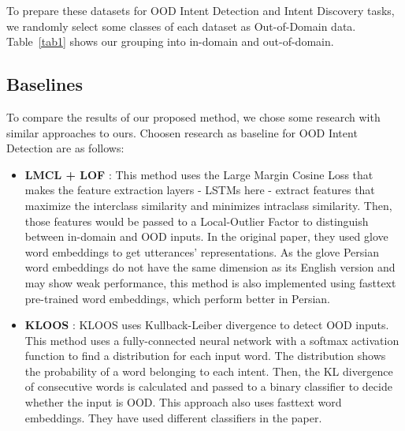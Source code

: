\documentclass{article}
\begin{document}
To prepare these datasets for OOD Intent Detection and Intent Discovery tasks,
we randomly select some classes of each dataset as Out-of-Domain data.
Table~\ref{tab1} shows our grouping into in-domain and out-of-domain.

\subsection{Baselines}

\noindent To compare the results of our proposed method, we chose some research with similar approaches to ours.
Choosen research as baseline for OOD Intent Detection are as follows:
\begin{itemize}
  \item \textbf{LMCL + LOF} \citep{lin-xu-2019-deep}: This method uses the Large Margin Cosine Loss that makes the feature extraction layers - LSTMs here - 
                                                    extract features that maximize the interclass similarity and minimizes intraclass similarity. 
                                                    Then, those features would be passed to a Local-Outlier Factor to distinguish between in-domain and OOD inputs. 
                                                    In the original paper, they used glove \citep{pennington2014glove} word embeddings to get utterances' representations. 
                                                    As the glove Persian word embeddings do not have the same dimension as its English version and may show weak performance, 
                                                    this method is also implemented using fasttext \citep{DBLP:journals/corr/JoulinGBM16} pre-trained word embeddings, which perform better in Persian.
  \item \textbf{KLOOS} \citep{10.1145/3397271.3401318}: KLOOS uses Kullback-Leiber divergence to detect OOD inputs. 
                                                      This method uses a fully-connected neural network with a softmax activation function to find a distribution for each input word. 
                                                      The distribution shows the probability of a word belonging to each intent. 
                                                      Then, the KL divergence of consecutive words is calculated and passed to a binary classifier to decide whether the input is OOD. 
                                                      This approach also uses fasttext word embeddings. 
                                                      They have used different classifiers in the paper. 

\end{itemize}
\end{document}
